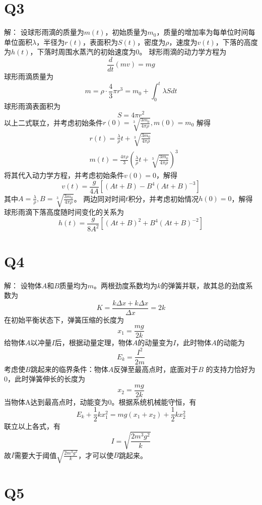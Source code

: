 \documentclass[10pt,a4paper]{article}
\theoremstyle{remark}
\begin{document}
\section*{Q3}解：
设球形雨滴的质量为$m(t)$，初始质量为$m_0$，质量的增加率为每单位时间每单位面积$\lambda$，半径为$r(t)$，表面积为$S(t)$，密度为$\rho$，速度为$v(t)$，下落的高度为$h(t)$，下落时周围水蒸汽的初始速度为$0$。 球形雨滴的动力学方程为
\[
\frac{d}{dt}(mv) = mg
\]
球形雨滴质量为
\[
m = \rho\cdot\frac{4}{3}\pi r^3 = m_0 + \int_0^t\lambda Sdt
\]
球形雨滴表面积为
\[
S = 4\pi r^2
\]
以上二式联立，并考虑初始条件$r(0) = \sqrt[3]{\frac{3m_0}{4\pi\rho}},m(0) = m_0$ 解得
\begin{align*}
&r(t) = \frac{\lambda}{\rho}t + \sqrt[3]{\frac{3m_0}{4\pi\rho}}\\
&m(t) = \frac{4\pi\rho}{3}(\frac{\lambda}{\rho}t + \sqrt[3]{\frac{3m_0}{4\pi\rho}})^3
\end{align*}
将其代入动力学方程，并考虑初始条件$v(0) = 0$，解得
\[
v(t) = \frac{g}{4A}[(At + B) - B^4(At + B)^{-3}]
\]
其中$A = \frac{\lambda}{\rho},B = \sqrt[3]{\frac{3m_0}{4\pi\rho}}$。 两边同对时间$t$积分，并考虑初始情况$h(0) = 0$，解得球形雨滴下落高度随时间变化的关系为
\[
h(t) = \frac{g}{8A^2}[(At + B)^2 + B^4(At + B)^{-2}]
\]
\section*{Q4}解：
设物体$A$和$B$质量均为$m$。两根劲度系数均为$k$的弹簧并联，故其总的劲度系数为
\[
K = \frac{k\Delta x + k\Delta x}{\Delta x} = 2k
\]
在初始平衡状态下，弹簧压缩的长度为
\[
x_1 = \frac{mg}{2k}
\]
给物体$A$以冲量$I$后，根据动量定理，物体$A$的动量变为$I$，此时物体$A$的动能为
\[
E_k = \frac{I^2}{2m}
\]
考虑使$B$跳起来的临界条件：物体$A$反弹至最高点时，底面对于$B$ 的支持力恰好为$0$，此时弹簧伸长的长度为
\[
x_2 = \frac{mg}{2k}
\]
当物体A达到最高点时，动能变为$0$。根据系统机械能守恒，有
\[
E_k + \frac{1}{2}kx_1^2 = mg(x_1 + x_2) + \frac{1}{2}kx_2^2
\]
联立以上各式，有
\[
I = \sqrt{\frac{2m^3g^2}{k}}
\]
故$I$需要大于阈值$\sqrt{\frac{2m^3g^2}{k}}$，才可以使$B$跳起来。
\section*{Q5}
\end{document}
